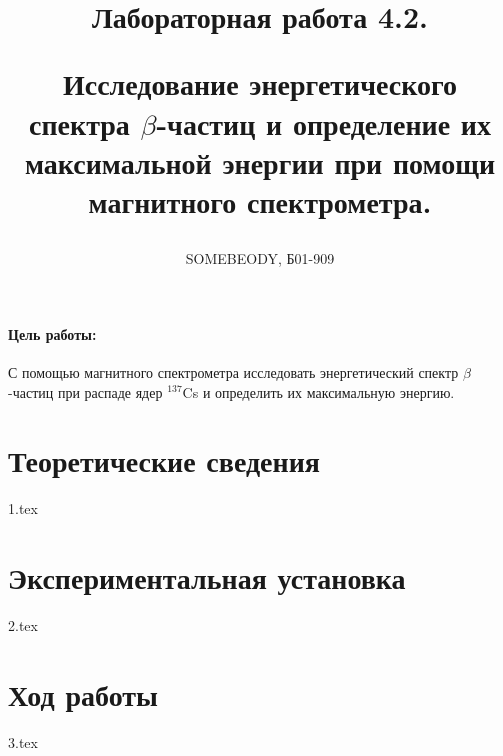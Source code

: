 \documentclass[a5paper, 10pt, twoside]{article} %
\title
{\hfill \break  \hfill \break
\hfill \break  \hfill \break
Лабораторная работа 4.2.

Исследование энергетического спектра $\beta$-частиц и определение их максимальной
энергии при помощи магнитного спектрометра.
}
\author{SOMEBEODY, Б01-909}
\begin{document}
\maketitle



\thispagestyle{empty} %

\newpage

\tableofcontents %
\thispagestyle{plain}
\newpage


\paragraph{Цель работы:}
С помощью магнитного спектрометра исследовать энергетический спектр
$\beta$-частиц при распаде ядер $^{137}$Cs и определить их максимальную
энергию.

\section{Теоретические сведения}
{1.tex}

\newpage
\section{Экспериментальная установка}
{2.tex}

\newpage
\section{Ход работы}
{3.tex}
\end{document}
